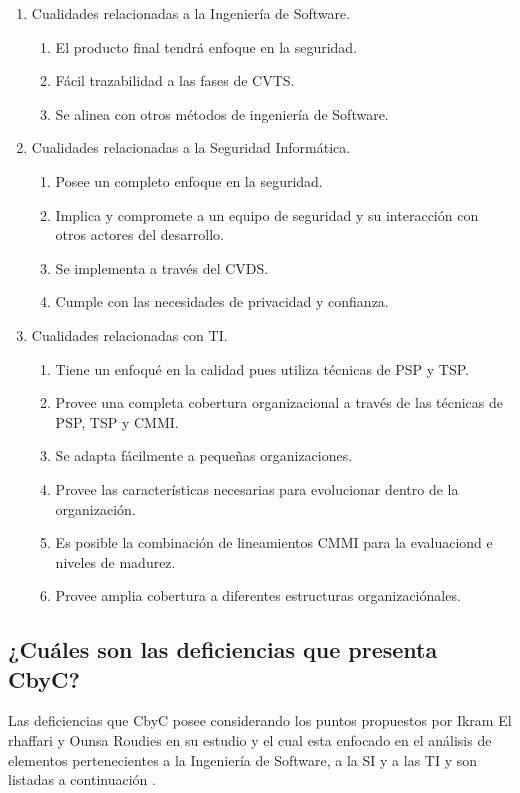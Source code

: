 \documentclass[runningheads,a4paper]{llncs}
\begin{document}
\begin{enumerate}
	\item Cualidades relacionadas a la Ingeniería de \gls{Software}.
		\begin{enumerate}
			\item El producto final tendrá enfoque en la seguridad.
			\item Fácil trazabilidad a las fases de \gls{CVTS}.
			\item Se alinea con otros métodos de ingeniería de \gls{Software}.\\
			
		\end{enumerate}
	\item Cualidades relacionadas a la Seguridad Informática.
		\begin{enumerate}
			\item Posee un completo enfoque en la seguridad.
			\item Implica y compromete a un equipo de seguridad y su interacción con otros actores del desarrollo.
			\item Se implementa a través del \gls{CVDS}.
			\item Cumple con las necesidades de privacidad y confianza.\\

		\end{enumerate}
	\item Cualidades relacionadas con \gls{TI}.
		\begin{enumerate}
			\item Tiene un enfoqué en la calidad pues utiliza técnicas de \gls{PSP} y \gls{TSP}. 
			\item Provee una completa cobertura organizacional a través de las técnicas de \gls{PSP}, \gls{TSP} y \gls{CMMI}.
			\item Se adapta fácilmente a pequeñas organizaciones.
			\item Provee las características necesarias para evolucionar dentro de la organización.
			\item Es posible la combinación de lineamientos \gls{CMMI} para la evaluaciond e niveles de madurez.
			\item Provee amplia cobertura a diferentes estructuras organizaciónales.
		\end{enumerate}
\end{enumerate}
     
\subsection{¿Cuáles son las deficiencias que presenta \gls{CbyC}?}
Las deficiencias que \gls{CbyC} posee considerando los puntos propuestos por Ikram El rhaffari y Ounsa Roudies en su estudio y el cual esta enfocado en el análisis de elementos pertenecientes a la Ingeniería de \gls{Software}, a la \gls{SI} y a las \gls{TI} y son listadas a continuación \cite{BenchmarkingSDLCLAPS}.
\end{document}
